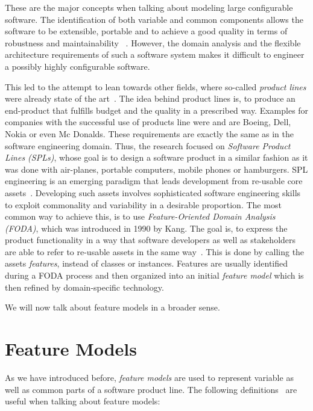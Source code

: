 These are the major concepts when talking about modeling large configurable software. The identification of both variable and common components allows the software to be extensible, portable and to achieve a good quality in terms of robustness and maintainability ~\cite{cost-based-prioritization,iso-9126}. However, the domain analysis and the flexible architecture requirements of such a software system makes it difficult to engineer a possibly highly configurable software. 

This led to the attempt to lean towards other fields, where so-called \emph{product lines} were already state of the art~\cite{feature-model-survey}. The idea behind product lines is, to produce an end-product that fulfills budget and the quality in a prescribed way. Examples for companies with the successful use of products line were and are Boeing, Dell, Nokia or even Mc Donalds. These requirements are exactly the same as in the software engineering domain. Thus, the research focused on \emph{Software Product Lines (SPLs)}, whose goal is to design a software product in a similar fashion as it was done with air-planes, portable computers, mobile phones or hamburgers. SPL engineering is an emerging paradigm that leads development from re-usable core assets~\cite{feature-ori-pl-engineering}. Developing such assets involves sophisticated software engineering skills to exploit commonality and variability in a desirable proportion. The most common way to achieve this, is to use \emph{Feature-Oriented Domain Analysis (FODA)}, which was introduced in 1990 by Kang. The goal is, to express the product functionality in a way that software developers as well as stakeholders are able to refer to re-usable assets in the same way~\cite{feature-ori-pl-engineering}. This is done by calling the assets \emph{features}, instead of classes or instances. 
Features are usually identified during a FODA process and then organized into an initial \emph{feature model} which is then refined by domain-specific technology.

We will now talk about feature models in a broader sense.


\section{Feature Models}\label{sec:models}

As we have introduced before, \emph{feature models} are used to represent variable as well as common parts of a software product line. The following definitions~\cite{staged-configuration} are useful when talking about feature models:

